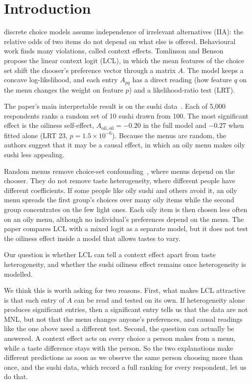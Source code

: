 \documentclass[11pt,journal,a4paper]{IEEEtran}
\newcommand{\Aoo}{A_{\mathrm{oil,oil}}}
\begin{document}
\section{Introduction}

 discrete choice models assume independence of irrelevant alternatives (IIA): the
relative odds of two items do not depend on what else is offered. Behavioural work finds many violations,
called context effects. Tomlinson and Benson~\cite{tb21} propose the linear context logit (LCL), in which the
mean features of the choice set shift the chooser's preference vector through a matrix $A$. The model keeps
a concave log-likelihood, and each entry $A_{pq}$ has a direct reading (how feature $q$ on the menu changes
the weight on feature $p$) and a likelihood-ratio test (LRT).

The paper's main interpretable result is on the sushi data~\cite{kamishima03}. Each of 5,000 respondents ranks
a random set of 10 sushi drawn from 100. The most significant effect is the oiliness self-effect,
$\Aoo=-0.20$ in the full model and $-0.27$ when fitted alone (LRT 23, $p=1.5\times10^{-6}$). Because the menus
are random, the authors suggest that it may be a causal effect, in which an oily menu makes oily sushi less
appealing.

Random menus remove choice-set confounding~\cite{tub21}, where menus depend on the chooser. They do not
remove taste heterogeneity, where different people have different coefficients. If some people like oily
sushi and others avoid it, an oily menu spreads the first group's choices over many oily items while the
second group concentrates on the few light ones. Each oily item is then chosen less often on an oily menu,
although no individual's preferences depend on the menu. The paper compares LCL with a mixed logit as a
separate model, but it does not test the oiliness effect inside a model that allows tastes to vary.

Our question is whether LCL can tell a context effect apart from taste heterogeneity, and whether the sushi
oiliness effect remains once heterogeneity is modelled.

We think this is worth asking for two reasons. First, what makes LCL attractive is that each entry of $A$ can
be read and tested on its own. If heterogeneity alone produces significant entries, then a significant entry
tells us that the data are not MNL, but not that the menu changes anyone's preferences, and causal readings
like the one above need a different test. Second, the question can actually be answered. A context effect
acts on every choice a person makes from a menu, while a taste difference stays with the person. So the two
explanations make different predictions as soon as we observe the same person choosing more than once, and
the sushi data, which record a full ranking for every respondent, let us do that.
\end{document}

